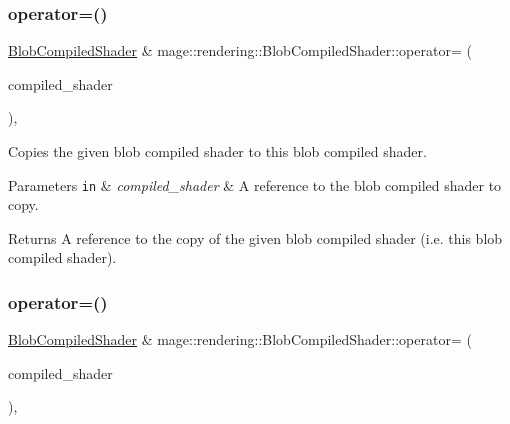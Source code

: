 \subsubsection{\texorpdfstring{operator=()}{operator=()}\hspace{0.1cm}{\footnotesize\ttfamily [1/2]}}
{\footnotesize\ttfamily \mbox{\hyperlink{classmage_1_1rendering_1_1_blob_compiled_shader}{Blob\+Compiled\+Shader}} \& mage\+::rendering\+::\+Blob\+Compiled\+Shader\+::operator= (\begin{DoxyParamCaption}\item[{const \mbox{\hyperlink{classmage_1_1rendering_1_1_blob_compiled_shader}{Blob\+Compiled\+Shader}} \&}]{compiled\+\_\+shader }\end{DoxyParamCaption})\hspace{0.3cm}{\ttfamily [default]}, {\ttfamily [noexcept]}}

Copies the given blob compiled shader to this blob compiled shader.


\begin{DoxyParams}[1]{Parameters}
\mbox{\tt in}  & {\em compiled\+\_\+shader} & A reference to the blob compiled shader to copy. \\
\hline
\end{DoxyParams}
\begin{DoxyReturn}{Returns}
A reference to the copy of the given blob compiled shader (i.\+e. this blob compiled shader). 
\end{DoxyReturn}
\mbox{\label{classmage_1_1rendering_1_1_blob_compiled_shader_a14954683e57897937b0e0178b5a726a4}} 
\subsubsection{\texorpdfstring{operator=()}{operator=()}\hspace{0.1cm}{\footnotesize\ttfamily [2/2]}}
{\footnotesize\ttfamily \mbox{\hyperlink{classmage_1_1rendering_1_1_blob_compiled_shader}{Blob\+Compiled\+Shader}} \& mage\+::rendering\+::\+Blob\+Compiled\+Shader\+::operator= (\begin{DoxyParamCaption}\item[{\mbox{\hyperlink{classmage_1_1rendering_1_1_blob_compiled_shader}{Blob\+Compiled\+Shader}} \&\&}]{compiled\+\_\+shader }\end{DoxyParamCaption})\hspace{0.3cm}{\ttfamily [default]}, {\ttfamily [noexcept]}}


